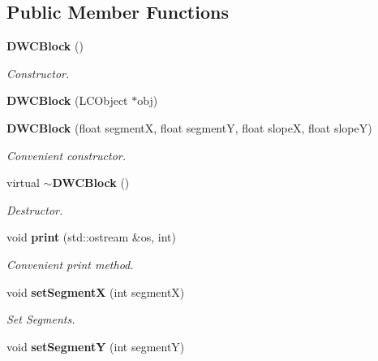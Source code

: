 \subsection*{Public Member Functions}
\begin{DoxyCompactItemize}
\item 
{\bf D\-W\-C\-Block} ()\label{classCALICE_1_1DWCBlock_a23f02464f283721d4993cff8cd5c8eef}

\begin{DoxyCompactList}\small\item\em Constructor. \end{DoxyCompactList}\item 
{\bfseries D\-W\-C\-Block} (L\-C\-Object $\ast$obj)\label{classCALICE_1_1DWCBlock_ab878aed4b01d1caf9ebeeec343bfa062}

\item 
{\bf D\-W\-C\-Block} (float segment\-X, float segment\-Y, float slope\-X, float slope\-Y)\label{classCALICE_1_1DWCBlock_af604f480f1847f1558ab7cac1027e942}

\begin{DoxyCompactList}\small\item\em Convenient constructor. \end{DoxyCompactList}\item 
virtual {\bf $\sim$\-D\-W\-C\-Block} ()\label{classCALICE_1_1DWCBlock_a69a20263fd7a3eb28dc65f2a1759047a}

\begin{DoxyCompactList}\small\item\em Destructor. \end{DoxyCompactList}\item 
void {\bf print} (std\-::ostream \&os, int)\label{classCALICE_1_1DWCBlock_a90acbeb3f3d2a8eae72177784bf13deb}

\begin{DoxyCompactList}\small\item\em Convenient print method. \end{DoxyCompactList}\item 
void {\bf set\-Segment\-X} (int segment\-X)\label{classCALICE_1_1DWCBlock_a9eaaba8d0e2acd92bc849fd7a4a17f34}

\begin{DoxyCompactList}\small\item\em Set Segments. \end{DoxyCompactList}\item 
void {\bfseries set\-Segment\-Y} (int segment\-Y)\label{classCALICE_1_1DWCBlock_ae64f6788fa1e258e06eda8941a9a6689}


\end{DoxyCompactItemize}
